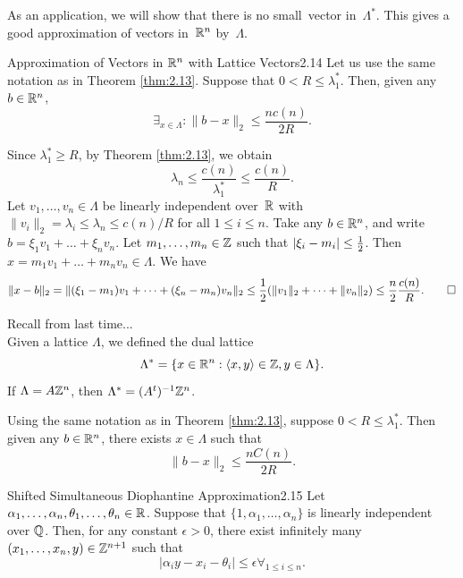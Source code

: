 \documentclass{Vorlesungstemplate_English} %
\begin{document}
\noindent As an application, we will show that there is no \glqq small\grqq \ vector in~\(\Lambda^*\).
This gives a good approximation of vectors in~\(\mathbb{R}^n\) by~\(\Lambda\).

\begin{corollary}{Approximation of Vectors in $\mathbb{R}^n$ with Lattice Vectors}{2.14}
    Let us use the same notation as in Theorem \ref{thm:2.13}.
    Suppose that \(0 < R \le \lambda_1^*\).
    Then, given any \(b \in \mathbb{R}^n\),
    \begin{equation*}
        \exists_{x \in \Lambda}: \|b - x\|_2
        \le \frac{n c(n)}{2R}.
    \end{equation*}
\end{corollary}

\begin{pf}
    Since \(\lambda_1^* \ge R\), by Theorem \ref{thm:2.13}, we obtain
    \begin{equation*}
        \lambda_n
        \le \frac{c(n)}{\lambda_1^*}
        \le \frac{c(n)}{R}.
    \end{equation*}
    Let \(v_1, \dots, v_n \in \Lambda\) be linearly independent over~\(\mathbb{R}\) with \(\|v_i\|_2 = \lambda_i \le \lambda_n \le c(n) / R\) for all \(1 \le i \le n\).
    Take any \(b \in \mathbb{R}^n\), and write \(b = \xi_1 v_1 + \dots + \xi_n v_n\).
    Let \(m_1, \dots, m_n \in \mathbb{Z}\) such that \(\left| \xi_i - m_i\right| \le \frac{1}{2}\).
    Then \(x = m_1 v_1 + \dots + m_n v_n \in \Lambda\).
    We have
    \begin{equation*}
        \|x - b\|_2
        = \|(\xi_1 - m_1) v_1 + \dots + (\xi_n - m_n) v_n\|_2
        \le \frac{1}{2} (\|v_1\|_2 + \dots + \|v_n\|_2)
        \le \frac{n}{2} \frac{c(n)}{R}. \qedhere
    \end{equation*}
\end{pf}
Recall from last time... \\
Given a lattice $\Lambda$, we defined the dual lattice
\[ \Lambda^* = \{ x \in \mathbb{R}^n: \langle x,y\rangle \in \mathbb{Z}, y \in \Lambda \}.\]
If $\Lambda = A\mathbb{Z}^n$, then $\Lambda^* = (A^t)^{-1}\mathbb{Z}^n$.
\begin{corollary*}{}
  Using the same notation as in Theorem \ref{thm:2.13}, suppose $0 < R \leq \lambda_1^*$. Then given any $b \in \mathbb{R}^n$, there exists $x \in \Lambda$ such that \[\| b - x \|_2 \leq \frac{nC(n)}{2R}.\]
\end{corollary*}
\begin{theorem}{Shifted Simultaneous Diophantine Approximation}{2.15}
  Let $\alpha_1, \dots, \alpha_n, \theta_1, \dots, \theta_n \in \mathbb{R}$. Suppose that $\{ 1, \alpha_1, \dots, \alpha_n\}$ is linearly independent over $\mathbb{Q}$. Then, for any constant $\epsilon > 0$, there exist infinitely many $(x_1, \dots, x_n, y) \in \mathbb{Z}^{n+1}$ such that
  \[ |\alpha_iy - x_i-\theta_i| \leq \epsilon \forall_{1 \leq i \leq n}.\]
\end{theorem}
\end{document}
